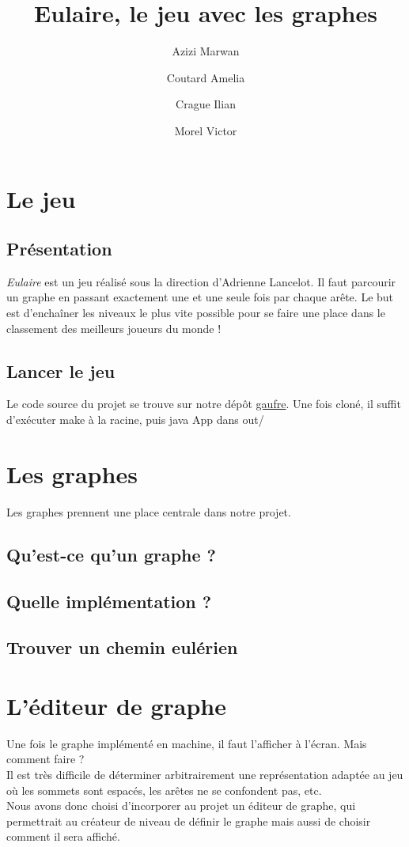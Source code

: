 \documentclass[12pt]{article}
\title{Eulaire, le jeu avec les graphes}
\author{Azizi Marwan \and Coutard Amelia \and Crague Ilian \and Morel Victor}
\begin{document}
\maketitle

\section{Le jeu}

\subsection{Présentation}
\textit{Eulaire} est un jeu réalisé sous la direction d'Adrienne Lancelot. Il faut parcourir un graphe en passant exactement une et une seule fois par chaque arête. Le but est d'enchaîner les niveaux le plus vite possible pour se faire une place dans le classement des meilleurs joueurs du monde  !

\subsection{Lancer le jeu}
Le code source du projet se trouve sur notre dépôt \href{https://gaufre.informatique.univ-paris-diderot.fr/eulaire/2022-al1-ga-eulaire}{gaufre}. Une fois cloné, il suffit d'exécuter make à la racine, puis java App dans out/

\section{Les graphes}
Les graphes prennent une place centrale dans notre projet.
\subsection{Qu'est-ce qu'un graphe ?}
\subsection{Quelle implémentation ?}
\subsection{Trouver un chemin eulérien}



\section{L'éditeur de graphe}
Une fois le graphe implémenté en machine, il faut l'afficher à l'écran. Mais comment faire ?\\
Il est très difficile de déterminer arbitrairement une représentation adaptée au jeu où les sommets sont espacés, les arêtes ne se confondent pas, etc.\\
Nous avons donc choisi d'incorporer au projet un éditeur de graphe, qui permettrait au créateur de niveau de définir le graphe mais aussi de choisir comment il sera affiché.
\end{document}
